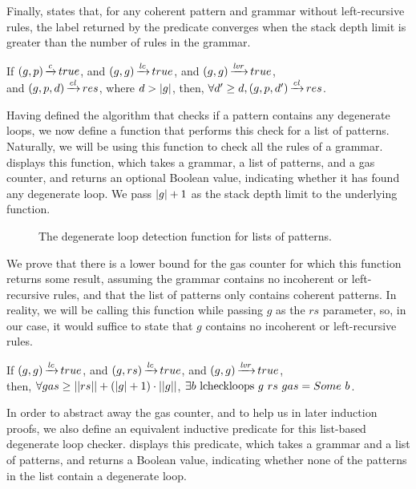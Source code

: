 Finally, 
states that, for any coherent pattern and grammar
without left-recursive rules,
the label returned by the predicate converges
when the stack depth limit is greater than
the number of rules in the grammar.

\begin{lemma}%
    If $(g,p) \operatorname{\xrightarrow{\mathit{c}}} true$,
    and $(g,g) \operatorname{\xrightarrow{\mathit{lc}}} true$,
    and $(g,g) \operatorname{\xrightarrow{\mathit{lvr}}} true$, \\
    and $(g,p,d) \operatorname{\xrightarrow{\mathit{cl}}} res$,
    where $d > |g|$,
    then, $\forall d' \ge d, (g,p,d') \operatorname{\xrightarrow{\mathit{cl}}} res$.
    \label{lemma:checkloops-d-convergence}
\end{lemma}

Having defined the algorithm
that checks if a pattern contains any degenerate loops,
we now define a function
that performs this check for a list of patterns.
Naturally, we will be using this
function to check all the rules of a grammar.
displays this function,
which takes a grammar, a list of patterns, and a gas counter,
and returns an optional Boolean value,
indicating whether it has found any degenerate loop.
We pass $|g|+1$ as
the stack depth limit to the underlying function.

\begin{figure}
    \centering
    
    \caption{The degenerate loop detection function for lists of patterns.}
    \label{fig:lcheckloops-function}
\end{figure}

We prove that there is a lower bound for the gas counter
for which this function returns some result,
assuming the grammar
contains no incoherent or left-recursive rules,
and that the list of patterns only
contains coherent patterns.
In reality, we will be calling this
function while passing $g$ as the $rs$ parameter,
so, in our case,
it would suffice to state that
$g$ contains no incoherent or left-recursive rules.

\begin{lemma}%
    If $(g,g) \operatorname{\xrightarrow{\mathit{lc}}} true$,
    and $(g,rs) \operatorname{\xrightarrow{\mathit{lc}}} true$,
    and $(g,g) \operatorname{\xrightarrow{\mathit{lvr}}} true$, \\
    then, $\forall gas \ge ||rs|| + (|g| + 1) \cdot ||g||$,
    $\exists b\ \lcheckloopscomp{g}{rs}{gas} = \Some b$.
\end{lemma}

In order to abstract away the gas counter,
and to help us in later induction proofs,
we also define an equivalent inductive predicate
for this list-based degenerate loop checker.
 displays this predicate,
which takes a grammar and a list of patterns,
and returns a Boolean value, indicating
whether none of the patterns in the list
contain a degenerate loop.

